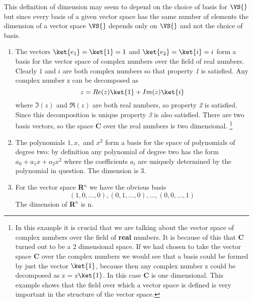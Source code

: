 This definition of dimension may seem to depend on the choice of basis for $\VS{}$ but since every basis of a given vector space has the same number of elements the dimension of a vector space $\VS{}$ depends only on $\VS{}$ and not the choice of basis.

\begin{enumerate}
\item The vectors $\ket{e_1} = \ket{1} = 1$ and $\ket{e_2} = \ket{i} = i$ form a basis for the vector space of complex numbers over the field of real numbers.
Clearly $1$ and $i$ are both complex numbers so that property \textit{1} is satisfied.
Any complex number z can be decomposed as
\begin{displaymath}
z = Re(z) \ket{1} + Im(z) \ket{i}
\end{displaymath}
where $\Im(z)$ and $\Re(z)$ are both real numbers, so property \textit{2} is satisfied.
Since this decomposition is unique property \textit{3} is also satisfied.
There are two basis vectors, so the space \textbf{C} over the real numbers is two dimensional. \footnote{In this example it is crucial that we are talking about the vector space of complex numbers over the field of \textbf{real} numbers.  It is because of this that \textbf{C} turned out to be a 2 dimensional space.  If we had chosen to take the vector space \textbf{C} over the complex numbers we would see that a basis could be formed by just the vector $\ket{1}$, because then any complex number z could be decomposed as z = z$\ket{1}$.  In this case \textbf{C} is one dimensional.  This example shows that the field over which a vector space is defined is very important in the structure of the vector space.}
\item The polynomials $1, x,$ and $x^{2}$ form a basis for the space of polynomials of degree two: by definition any polynomial of degree two has the form $a_0 + a_{1}x + a_{2}x^{2}$ where the coefficients $a_i$ are uniquely determined by the polynomial in question.
The dimension is 3.
\item For the vector space \textbf{R}$^{n}$ we have the obvious basis
\begin{displaymath}
(1,0,\ldots ,0), (0,1,\ldots ,0), \ldots , (0,0,\ldots ,1)
\end{displaymath}
The dimension of \textbf{R}$^{n}$ is n.
\end{enumerate}

